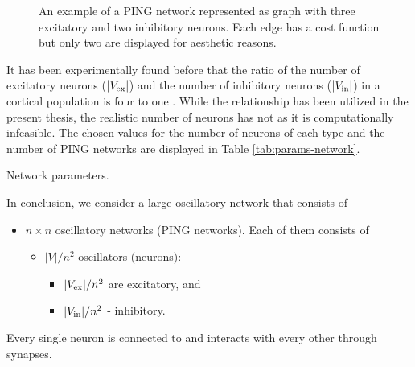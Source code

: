 \begin{figure}[!htp]
    \centering
    
    \caption[PING network as a graph]{An example of a PING network represented as graph with three excitatory and two inhibitory neurons. Each edge has a cost function but only two are displayed for aesthetic reasons.}
    \label{fig:single-ping-graph}
\end{figure}

It has been experimentally found before that the ratio of the number of excitatory neurons ($|V_{\mathrm{ex}}|$) and the number of inhibitory neurons ($|V_{\mathrm{in}}|$) in a cortical population is four to one \cite{Pastore2018}. While the relationship has been utilized in the present thesis, the realistic number of neurons has not as it is computationally infeasible. The chosen values for the number of neurons of each type and the number of PING networks are displayed in Table \ref{tab:params-network}.

\begin{table}[!htp]
    \centering
    
    \caption{Network parameters.}
    \label{tab:params-network}
\end{table}

In conclusion, we consider a large oscillatory network that consists of
\startbulletsnospace
\begin{itemize}
    \item $n \times n$ oscillatory networks (PING networks). Each of them consists of
    \vspace{-0.5em}
    \begin{itemize}
        \item $|V| / n^2$ oscillators (neurons):
        \begin{itemize}
            \item $|V_{\mathrm{ex}}| / n^2$ are excitatory, and
            \item $|V_{\mathrm{in}}| / n^2$ - inhibitory.
        \end{itemize}
    \end{itemize}
\end{itemize}
\startbulletsnospace
Every single neuron is connected to and interacts with every other through synapses. 